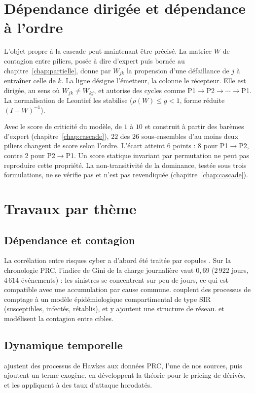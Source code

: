 \section{Dépendance dirigée et dépendance à l'ordre}

L'objet propre à la cascade peut maintenant être précisé. La matrice $W$ de contagion entre
piliers, posée à dire d'expert puis bornée au chapitre~\ref{chap:partielle}, donne par $W_{jk}$
la propension d'une défaillance de $j$ à entraîner celle de $k$. La ligne désigne l'émetteur,
la colonne le récepteur. Elle est dirigée, au sens où $W_{jk}\neq W_{kj}$, et autorise des cycles
comme P1$\to$P2$\to\cdots\to$P1. La normalisation de Leontief les stabilise
($\rho(W)\le g<1$, forme réduite $(I-W)^{-1}$).

Avec le score de criticité du modèle, de $1$ à $10$ et construit à partir des barèmes d'expert
(chapitre~\ref{chap:cascade}), $22$ des $26$ sous-ensembles d'au moins deux piliers changent de
score selon l'ordre. L'écart atteint $6$ points : $8$ pour P1$\to$P2, contre $2$ pour
P2$\to$P1. Un score statique invariant par permutation ne peut pas reproduire cette propriété.
La non-transitivité de la dominance, testée sous trois formulations, ne se vérifie pas et n'est
pas revendiquée (chapitre~\ref{chap:cascade}).

\section{Travaux par thème}
\label{sec:travaux-par-theme}

\subsection*{Dépendance et contagion}
La corrélation entre risques cyber a d'abord été traitée par
copules \citep{BohmeKataria2006, HerathHerath2011}. Sur la chronologie PRC, l'indice de Gini de la charge journalière vaut $0{,}69$ ($2\,922$ jours, $4\,614$ événements) : les sinistres se concentrent sur peu de jours, ce qui est compatible avec une accumulation par cause commune.
\citet{HillairetLopez2021} couplent des processus de comptage à un modèle épidémiologique
compartimental de type SIR (susceptibles, infectés, rétablis), et \citet{HillairetLopezDOultremontSpoorenberg2022} y ajoutent une
structure de réseau. \citet{XuHua2017} et \citet{Baldwin2017} modélisent la contagion entre cibles.

\subsection*{Dynamique temporelle}
\citet{BessyRolandBoumezouedHillairet2021} ajustent des processus de
Hawkes aux données PRC, l'une de nos sources, puis \citet{BoumezouedCherkaouiHillairet2023}
ajoutent un terme exogène. \citet{HillairetReveillacRosenbaum2021} en développent la théorie pour le
pricing de dérivés, et \citet{Peng2016} les appliquent à des taux d'attaque horodatés.

